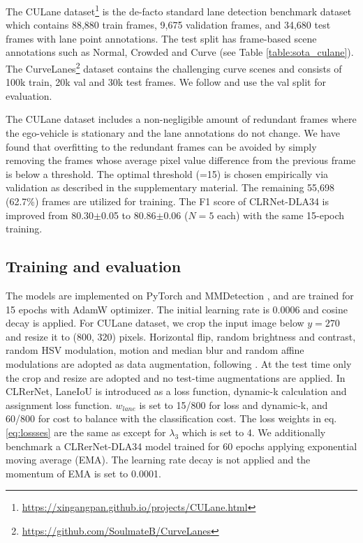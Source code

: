 \documentclass[10pt,twocolumn,letterpaper]{article}
\begin{document}
The CULane dataset\footnote{\url{https://xingangpan.github.io/projects/CULane.html}}\cite {pan2018SCNN} is the de-facto standard lane detection benchmark dataset which contains 88,880 train frames, 9,675 validation frames, and 34,680 test frames with lane point annotations. The test split has frame-based scene annotations such as Normal, Crowded and Curve (see Table \ref{table:sota_culane}). 
The CurveLanes\footnote{\url{https://github.com/SoulmateB/CurveLanes}} \cite{CurveLane-NAS} dataset contains the challenging curve scenes and consists of 100k train, 20k val and 30k test frames. We follow \cite{Liu_2021_ICCV} and use the val split for evaluation.

 The CULane dataset includes a non-negligible amount of redundant frames where the ego-vehicle is stationary and the lane annotations do not change. We have found that overfitting to the redundant frames can be avoided by simply removing the frames whose average pixel value difference from the previous frame is below a threshold. The optimal threshold (=15) is chosen empirically via validation as described in the supplementary material. The remaining 55,698 (62.7\%) frames are utilized for training. The F1 score of CLRNet-DLA34 is improved from 80.30$\pm$0.05 to 80.86$\pm0.06$ ($N=5$ each) with the same 15-epoch training.

\subsection {Training and evaluation}\label{subsec:train_eval}
The models are implemented on PyTorch and MMDetection \cite{mmdetection}, and are trained for 15 epochs with AdamW \cite{loshchilov2018decoupled} optimizer. The initial learning rate is 0.0006 and cosine decay is applied. For CULane dataset, we crop the input image below $y=270$ and resize it to (800, 320) pixels. Horizontal flip, random brightness and contrast, random HSV modulation, motion and median blur and random affine modulations are adopted as data augmentation, following \cite{Zheng_2022_CVPR}. At the test time only the crop and resize are adopted and no test-time augmentations are applied.
In CLRerNet, LaneIoU is introduced as a loss function, dynamic-k calculation and assignment loss function. $w_{lane}$ is set to 15/800 for loss and dynamic-k, and 60/800 for cost to balance with the classification cost. The loss weights in eq. \ref{eq:lossses} are the same as \cite{Zheng_2022_CVPR} except for $\lambda_3$ which is set to 4. 
We additionally benchmark a CLRerNet-DLA34 model trained for 60 epochs applying exponential moving average (EMA). The learning rate decay is not applied and the momentum of EMA is set to 0.0001.
\end{document}
